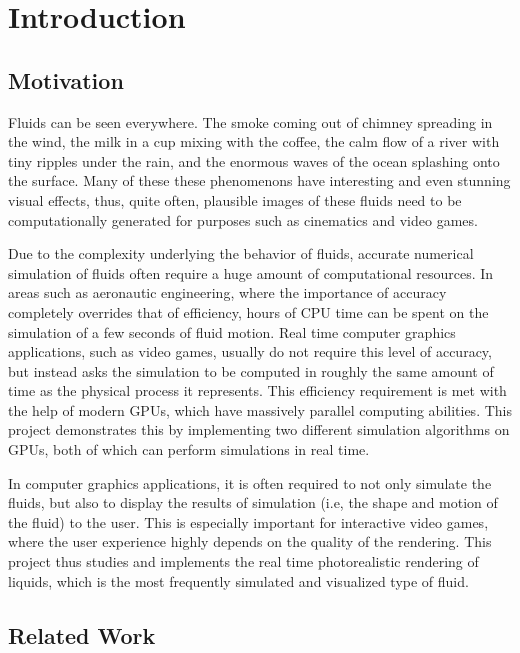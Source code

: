 \chapter{Introduction}

\section{Motivation}
Fluids can be seen everywhere. The smoke coming out of chimney spreading in the wind, the milk in a cup mixing with the coffee, the calm flow of a river with tiny ripples under the rain, and the enormous waves of the ocean splashing onto the surface. Many of these these phenomenons have interesting and even stunning visual effects, thus, quite often, plausible images of these fluids need to be computationally generated for purposes such as cinematics and video games. 

Due to the complexity underlying the behavior of fluids, accurate numerical simulation of fluids often require a huge amount of computational resources. In areas such as aeronautic engineering, where the importance of accuracy completely overrides that of efficiency, hours of CPU time can be spent on the simulation of a few seconds of fluid motion. Real time computer graphics applications, such as video games, usually do not require this level of accuracy, but instead asks the simulation to be computed in roughly the same amount of time as the physical process it represents. This efficiency requirement is met with the help of modern GPUs, which have massively parallel computing abilities. This project demonstrates this by implementing two different simulation algorithms on GPUs, both of which can perform simulations in real time.

In computer graphics applications, it is often required to not only simulate the fluids, but also to display the results of simulation (i.e, the shape and motion of the fluid) to the user. This is especially important for interactive video games, where the user experience highly depends on the quality of the rendering. This project thus studies and implements the real time photorealistic rendering of liquids, which is the most frequently simulated and visualized type of fluid.






\section{Related Work}



